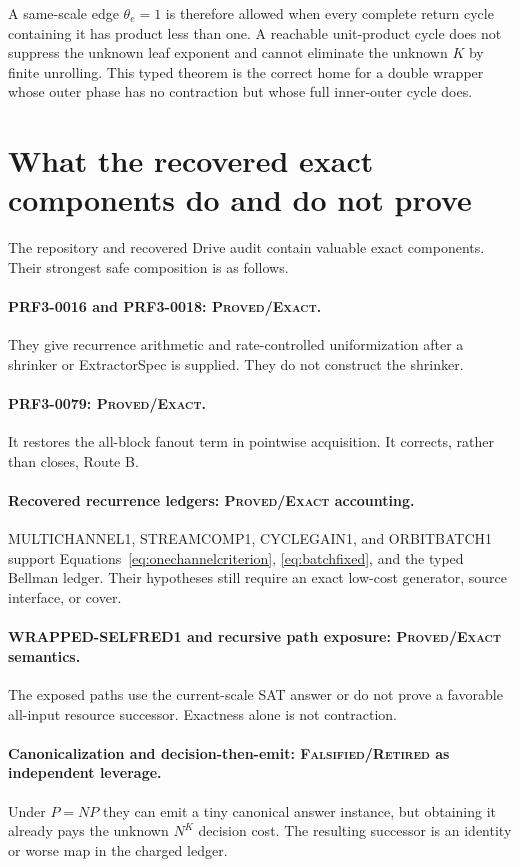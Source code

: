 \documentclass[11pt]{article}
\begin{document}
A same-scale edge $\theta_e=1$ is therefore allowed when every complete return
cycle containing it has product less than one.  A reachable unit-product cycle
does not suppress the unknown leaf exponent and cannot eliminate the unknown
$K$ by finite unrolling.  This typed theorem is the correct home for a double
wrapper whose outer phase has no contraction but whose full inner-outer cycle
does.

\section{What the recovered exact components do and do not prove}

The repository and recovered Drive audit contain valuable exact components.
Their strongest safe composition is as follows.

\paragraph{PRF3-0016 and PRF3-0018: \textsc{Proved/Exact}.}
They give recurrence arithmetic and rate-controlled uniformization after a
shrinker or ExtractorSpec is supplied.  They do not construct the shrinker.

\paragraph{PRF3-0079: \textsc{Proved/Exact}.}
It restores the all-block fanout term in pointwise acquisition.  It corrects,
rather than closes, Route B.

\paragraph{Recovered recurrence ledgers: \textsc{Proved/Exact} accounting.}
MULTICHANNEL1, STREAMCOMP1, CYCLEGAIN1, and ORBITBATCH1 support
Equations~\eqref{eq:onechannelcriterion},
\eqref{eq:batchfixed}, and the typed Bellman ledger.  Their hypotheses still
require an exact low-cost generator, source interface, or cover.

\paragraph{WRAPPED-SELFRED1 and recursive path exposure: \textsc{Proved/Exact}
semantics.}
The exposed paths use the current-scale SAT answer or do not prove a favorable
all-input resource successor.  Exactness alone is not contraction.

\paragraph{Canonicalization and decision-then-emit: \textsc{Falsified/Retired}
as independent leverage.}
Under $P=NP$ they can emit a tiny canonical answer instance, but obtaining it
already pays the unknown $N^K$ decision cost.  The resulting successor is an
identity or worse map in the charged ledger.
\end{document}
